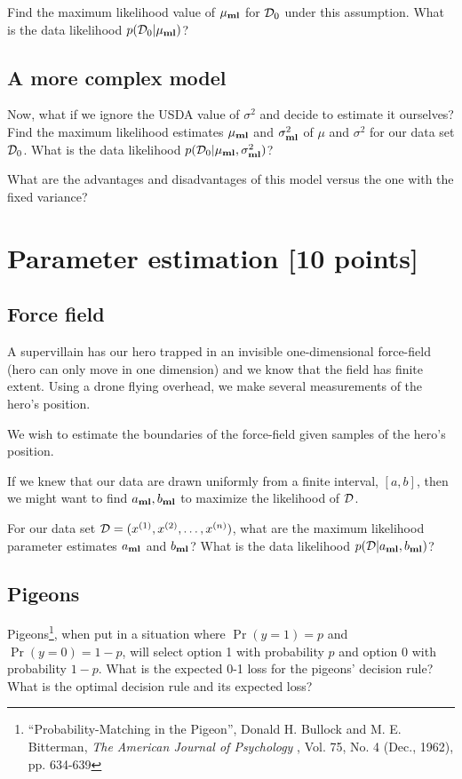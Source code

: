 \documentclass[11pt]{exam}
\newcommand\ex[2]{#1^{(#2)}}
\newcommand\data{{\cal D}}
\newcommand\ml[1]{#1_{\bf ml}}
\newcommand{\note}[1]{\todo[color=blue!10,inline, linecolor=blue!90,size=\footnotesize]{\linespread{0.9}\selectfont{#1}\par}}
\begin{document}
Find the maximum likelihood value of $\ml\mu$ for $\data_0$ under this
assumption.  What is
the data likelihood $p(\data_0 | \ml\mu)$?  



\subsection{A more complex model}
Now, what if we ignore the USDA value of $\sigma^2$ and decide to
estimate it ourselves?
Find the maximum likelihood estimates $\ml\mu$ and
  $\ml\sigma^2$ of $\mu$ and $\sigma^2$ for our data set $\data_0$.
  What is the data
  likelihood $p(\data_0 | \ml\mu, \ml\sigma^2)$?
  
What are the advantages and disadvantages of this model versus
the one with the fixed variance?



\section{Parameter estimation [10 points]}

\subsection{Force field}
A supervillain has our hero trapped in an invisible
one-dimensional force-field (hero can only move in one dimension) and
we know that the field has finite extent.  Using a drone flying overhead, we
make several measurements of the hero's position.

We wish to estimate the boundaries of the force-field given
samples of the hero's position.

If we knew that our data are drawn uniformly from a finite interval,
$[a, b]$, then we might want to find $\ml{a}, \ml{b}$ to maximize the
likelihood of $\data$.

For our data set $\data = (\ex x1, \ex x2,\dots,\ex x n)$, what are the maximum likelihood parameter
estimates $\ml{a}$ and $\ml{b}$?  What is the data likelihood $p(\data |
\ml{a}, \ml{b})$?

\note{Is this model of the hero data a good one? Why or why not?}






\subsection{Pigeons}
Pigeons\footnote{``Probability-Matching in the Pigeon'',
  Donald H. Bullock and M. E. Bitterman, {\it The American Journal of
    Psychology} , Vol. 75, No. 4 (Dec., 1962), pp. 634-639}, when put
in a situation where $\Pr(y=1) = p$ and $\Pr(y=0) = 1-p$, will select option 1 with
probability $p$ and option 0 with probability $1 - p$.  What is the
expected 0-1 loss for the pigeons' decision rule?  What is the optimal
decision rule and its expected loss?
\end{document}

